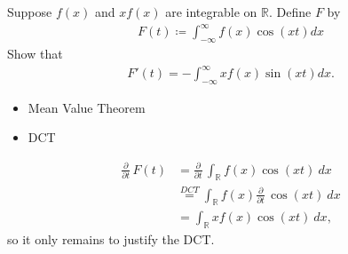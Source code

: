 Suppose \(f(x)\) and \(xf(x)\) are integrable on \({\mathbb{R}}\).
Define \(F\) by
\begin{align*}
F(t)\coloneqq\int _{-\infty}^{\infty} f(x) \cos (x t) dx
\end{align*}
Show that
\begin{align*}
F'(t)=-\int _{-\infty}^{\infty} x f(x) \sin (x t) dx
.\end{align*}


\begin{solution}

\hfill

\begin{concept}

\hfill

\begin{itemize}
\tightlist
\item
  Mean Value Theorem
\item
  DCT
\end{itemize}

\end{concept}

\begin{align*}
{\frac{\partial }{\partial t}\,} F(t) 
&= {\frac{\partial }{\partial t}\,} \int_{\mathbb{R}}f(x) \cos(xt) ~dx \\
&\overset{DCT}= \int_{\mathbb{R}}f(x) {\frac{\partial }{\partial t}\,} \cos(xt) ~dx \\
&= \int_{\mathbb{R}}xf(x) \cos(xt)~dx
,\end{align*}
so it only remains to justify the DCT.


\end{solution}
